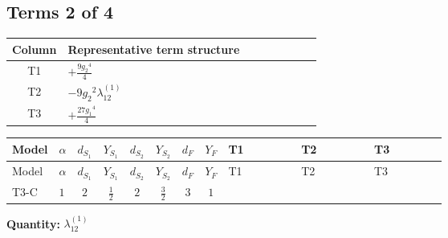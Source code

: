 \documentclass[8pt]{article}
\begin{document}
\begin{landscape}
\subsection*{Terms 2 of 4}
\begin{center}
\begin{tabular}{@{}c >{\raggedright\arraybackslash}p{0.82\linewidth}@{}}
\toprule
Column & Representative term structure \\
\midrule
T1 & \(\displaystyle +\frac{9 {g_2}^4}{4}\) \\
\midrule
T2 & \(\displaystyle -9 {g_2}^2 {\lambda_{12}^{(1)}}\) \\
\midrule
T3 & \(\displaystyle +\frac{27 {g_1}^4}{4}\) \\
\midrule
\bottomrule
\end{tabular}
\end{center}
\smallskip
\tiny
\begin{longtable}{@{}llcccccc >{\raggedright\arraybackslash}p{0.21\linewidth} >{\raggedright\arraybackslash}p{0.21\linewidth} >{\raggedright\arraybackslash}p{0.21\linewidth}@{}}
\toprule
Model & $\alpha$ & $d_{S_1}$ & $Y_{S_1}$ & $d_{S_2}$ & $Y_{S_2}$ & $d_F$ & $Y_F$ & T1 & T2 & T3 \\
\midrule
\endfirsthead
\toprule
Model & $\alpha$ & $d_{S_1}$ & $Y_{S_1}$ & $d_{S_2}$ & $Y_{S_2}$ & $d_F$ & $Y_F$ & T1 & T2 & T3 \\
\midrule
\endhead
T3-C & $1$ & $2$ & $\frac{1}{2}$ & $2$ & $\frac{3}{2}$ & $3$ & $1$ & \scriptsize\adjustbox{max width=\linewidth}{$\begin{gathered} +\frac{9 {g_2}^4}{4}\end{gathered}$} & \scriptsize\adjustbox{max width=\linewidth}{$\begin{gathered} -9 {g_2}^2 {\lambda_{12}^{(1)}}\end{gathered}$} & \scriptsize\adjustbox{max width=\linewidth}{$\begin{gathered} +\frac{27 {g_1}^4}{4}\end{gathered}$} \\
\midrule
\bottomrule
\end{longtable}
\clearpage
\noindent\textbf{Quantity: }$\lambda_{12}^{(1)}$\par\smallskip

\end{landscape}
\end{document}
